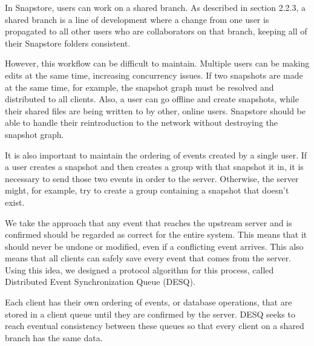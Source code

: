 In Snapstore, users can work on a shared branch. As described in section 2.2.3, a shared branch is a line of development where a change from one user is propagated to all other users who are collaborators on that branch, keeping all of their Snapstore folders consistent.

However, this workflow can be difficult to maintain. Multiple users can be making edits at the same time, increasing concurrency issues. If two snapshots are made at the same time, for example, the snapshot graph must be resolved and distributed to all clients. Also, a user can go offline and create snapshots, while their shared files are being written to by other, online users. Snapstore should be able to handle their reintroduction to the network without destroying the snapshot graph.

It is also important to maintain the ordering of events created by a single user. If a user creates a snapshot and then creates a group with that snapshot it in, it is necessary to send those two events in order to the server. Otherwise, the server might, for example, try to create a group containing a snapshot that doesn't exist.

We take the approach that any event that reaches the upstream server and is confirmed should be regarded as correct for the entire system. This means that it should never be undone or modified, even if a conflicting event arrives. This also means that all clients can safely save every event that comes from the server. Using this idea, we designed a protocol algorithm for this process, called Distributed Event Synchronization Queue (DESQ).

Each client has their own ordering of events, or database operations, that are stored in a client queue until they are confirmed by the server. DESQ seeks to reach eventual consistency between these queues so that every client on a shared branch has the same data.


